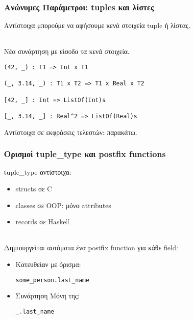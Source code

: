 \documentclass{beamer}
\def\e{\foreignlanguage{english}}
\def\h{\e{Haskell}}
\begin{document}
\begin{frame}[fragile]

\frametitle{Ανώνυμες Παράμετροι: \e{tuples} και λίστες}

Αντίστοιχα μπορούμε να αφήσουμε κενά στοιχεία \e{tuple} ή λίστας.
\\~\

Νέα συνάρτηση με είσοδο τα κενά στοιχεία.

\begin{otherlanguage}{english}
\begin{verbatim}
(42, _) : T1 => Int x T1

(_, 3.14, _) : T1 x T2 => T1 x Real x T2

[42, _] : Int => ListOf(Int)s

[_, 3.14, _] : Real^2 => ListOf(Real)s

\end{verbatim}
\end{otherlanguage}

Αντίστοιχα σε εκφράσεις τελεστών: παρακάτω.

\end{frame}

\begin{frame}[fragile]

\frametitle{Ορισμοί \e{tuple\_type} και \e{postfix functions}}

\e{tuple\_type} αντίστοιχα:

\begin{itemize}

\item \e{structs} σε \e{C}

\item \e{classes} σε \e{OOP}: μόνο \e{attributes}

\item \e{records} σε \h
\\~\

\end{itemize}

Δημιουργείται αυτόματα ένα \e{postfix function} για κάθε \e{field}:

\begin{itemize}

\item Κατευθείαν με όρισμα:
\begin{otherlanguage}{english}
\verb|some_person.last_name|
\end{otherlanguage}

\item Συνάρτηση Μόνη της:
\begin{otherlanguage}{english}
\verb|_.last_name|
\end{otherlanguage}

\end{itemize}

\end{frame}
\end{document}
